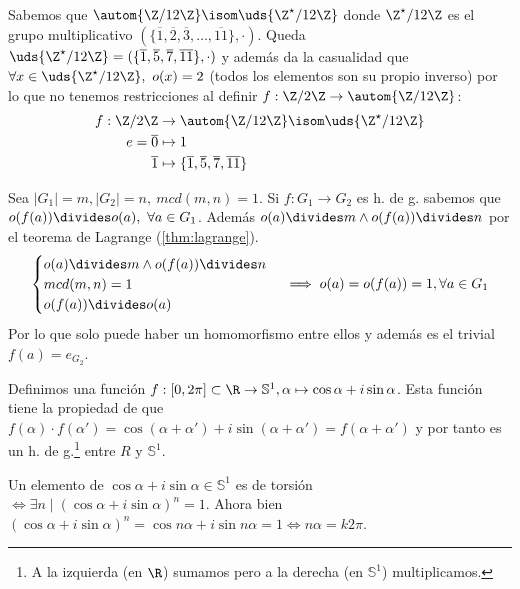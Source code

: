 \begin{ex}[H2.25]
	Sabemos que $\autom{\Z/12\Z} \isom \uds{\Z^\star/12\Z}$ donde $\Z^\star/12\Z$ es el grupo multiplicativo $(\{\overline{1}, \overline{2}, \overline{3}, \dots,  \overline{11}\}, \cdot)$. Queda $\uds{\Z^\star/12\Z} = (\{\overline{1}, \overline{5}, \overline{7}, \overline{11}\}, \cdot )$ y además da la casualidad que $\forall x \in \uds{\Z^\star/12\Z},\ o(x) = 2$ (todos los elementos son su propio inverso) por lo que no tenemos restricciones al definir $f: \Z/2\Z \to \autom{\Z/12\Z}$:
	\begin{align*}
		f:\Z/2\Z & \to \autom{\Z/12\Z} \isom \uds{\Z^\star/12\Z} \\
		e = \overline{0} &\mapsto 1 \\
		\overline{1} &\mapsto \{\overline{1}, \overline{5}, \overline{7}, \overline{11}\}
	\end{align*}
\end{ex}

\begin{ex}[H2.26]
	Sea $|G_1| = m, |G_2| = n,\ mcd(m, n) = 1$. Si $f:G_1 \to G_2$ es h. de g. sabemos que $o(f(a)) \divides o(a),\ \forall a \in G_1$. Además $o(a) \divides m \land o(f(a)) \divides n$ por el teorema de Lagrange (\ref{thm:lagrange}).
	\begin{align*}
		\begin{cases}
		o(a) \divides m \land o(f(a)) \divides n \\
		mcd(m, n) = 1 \\
		o(f(a)) \divides o(a)
		\end{cases} \implies o(a) = o(f(a)) = 1, \forall a \in G_1
	\end{align*}
	Por lo que solo puede haber un homomorfismo entre ellos y además es el trivial $f(a) = e_{G_2}$.
\end{ex}

\begin{ex}[H2.19]
	Definimos una función $f:[0, 2\pi] \subset \R \to \mathbb{S}^1, \alpha\mapsto \cos \alpha + i \sin \alpha$. Esta función tiene la propiedad de que $f(\alpha) \cdot f(\alpha') = \cos(\alpha + \alpha') + i\sin(\alpha + \alpha') = f(\alpha + \alpha')$ y por tanto es un h. de g.\footnote{A la izquierda (en $\R$) sumamos pero a la derecha (en $\mathbb{S}^1$) multiplicamos.} entre $R$ y $\mathbb{S}^1$.
	
	Un elemento de $\cos \alpha + i \sin \alpha \in \mathbb{S}^1$ es de torsión $\iff \exists n \mid (\cos \alpha + i \sin \alpha )^n = 1$. Ahora bien $(\cos \alpha + i \sin \alpha )^n = \cos n\alpha + i \sin n\alpha = 1 \iff n\alpha = k 2\pi$. 
\end{ex}

